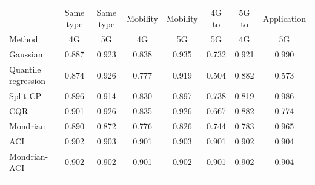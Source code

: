 \begin{tabular}{@{}lccccccc@{}}
\toprule
 & Same type & Same type & Mobility & Mobility & 4G to & 5G to & Application \\
Method & 4G & 5G & 4G & 5G & 5G & 4G & 5G \\
\midrule
Gaussian & 0.887 & 0.923 & 0.838 & 0.935 & 0.732 & 0.921 & 0.990 \\
Quantile regression & 0.874 & 0.926 & 0.777 & 0.919 & 0.504 & 0.882 & 0.573 \\
Split CP & 0.896 & 0.914 & 0.830 & 0.897 & 0.738 & 0.819 & 0.986 \\
CQR & 0.901 & 0.926 & 0.835 & 0.926 & 0.667 & 0.882 & 0.774 \\
Mondrian & 0.890 & 0.872 & 0.776 & 0.826 & 0.744 & 0.783 & 0.965 \\
ACI & 0.902 & 0.903 & 0.901 & 0.903 & 0.901 & 0.902 & 0.904 \\
Mondrian-ACI & 0.902 & 0.902 & 0.901 & 0.902 & 0.901 & 0.902 & 0.904 \\
\botrule
\end{tabular}
